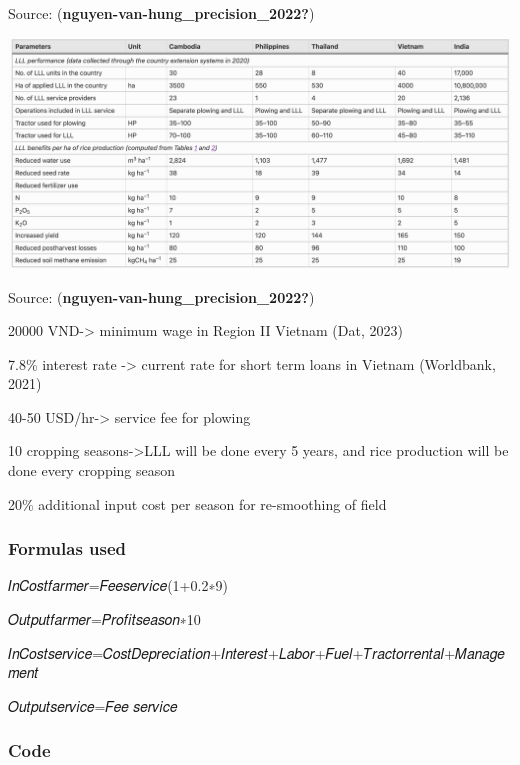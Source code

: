 \documentclass[
]{article}
\begin{document}
Source: (\textbf{nguyen-van-hung\_precision\_2022?})

\includegraphics{images/Screenshot 2023-06-16 at 12.29.18 PM.png}

Source: (\textbf{nguyen-van-hung\_precision\_2022?})

20000 VND-\textgreater{} minimum wage in Region II Vietnam (Dat, 2023)

7.8\% interest rate -\textgreater{} current rate for short term loans in
Vietnam (Worldbank, 2021)

40-50 USD/hr-\textgreater{} service fee for plowing

10 cropping seasons-\textgreater LLL will be done every 5 years, and
rice production will be done every cropping season

20\% additional input cost per season for re-smoothing of field

\hypertarget{formulas-used}{%
\subsubsection{\texorpdfstring{\textbf{Formulas
used}}{Formulas used}}\label{formulas-used}}

𝐼𝑛𝐶𝑜𝑠𝑡𝑓𝑎𝑟𝑚𝑒𝑟=𝐹𝑒𝑒𝑠𝑒𝑟𝑣𝑖𝑐𝑒(1+0.2∗9)

𝑂𝑢𝑡𝑝𝑢𝑡𝑓𝑎𝑟𝑚𝑒𝑟=𝑃𝑟𝑜𝑓𝑖𝑡𝑠𝑒𝑎𝑠𝑜𝑛∗10

𝐼𝑛𝐶𝑜𝑠𝑡𝑠𝑒𝑟𝑣𝑖𝑐𝑒=𝐶𝑜𝑠𝑡𝐷𝑒𝑝𝑟𝑒𝑐𝑖𝑎𝑡𝑖𝑜𝑛+𝐼𝑛𝑡𝑒𝑟𝑒𝑠𝑡+𝐿𝑎𝑏𝑜𝑟+𝐹𝑢𝑒𝑙+𝑇𝑟𝑎𝑐𝑡𝑜𝑟𝑟𝑒𝑛𝑡𝑎𝑙+𝑀𝑎𝑛𝑎𝑔𝑒𝑚𝑒𝑛𝑡

𝑂𝑢𝑡𝑝𝑢𝑡𝑠𝑒𝑟𝑣𝑖𝑐𝑒=𝐹𝑒𝑒 𝑠𝑒𝑟𝑣𝑖𝑐𝑒

\hypertarget{code}{%
\subsubsection{Code}\label{code}}
\end{document}

